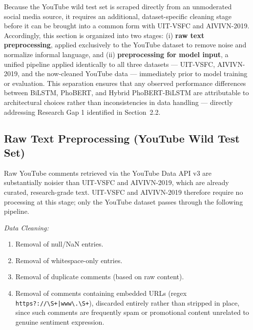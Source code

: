 \documentclass[12pt]{report} %
\begin{document}
Because the YouTube wild test set is scraped directly from an unmoderated social media source, it requires an additional, dataset-specific cleaning stage before it can be brought into a common form with UIT-VSFC and AIVIVN-2019. Accordingly, this section is organized into two stages: (i) \textbf{raw text preprocessing}, applied exclusively to the YouTube dataset to remove noise and normalize informal language, and (ii) \textbf{preprocessing for model input}, a unified pipeline applied identically to all three datasets --- UIT-VSFC, AIVIVN-2019, and the now-cleaned YouTube data --- immediately prior to model training or evaluation. This separation ensures that any observed performance differences between BiLSTM, PhoBERT, and Hybrid PhoBERT-BiLSTM are attributable to architectural choices rather than inconsistencies in data handling --- directly addressing Research Gap 1 identified in Section~2.2.

\subsection{Raw Text Preprocessing (YouTube Wild Test Set)}

Raw YouTube comments retrieved via the YouTube Data API v3 are substantially noisier than UIT-VSFC and AIVIVN-2019, which are already curated, research-grade text. UIT-VSFC and AIVIVN-2019 therefore require no processing at this stage; only the YouTube dataset passes through the following pipeline.

\textit{Data Cleaning:}
\begin{enumerate}
    \item Removal of null/NaN entries.
    \item Removal of whitespace-only entries.
    \item Removal of duplicate comments (based on raw content).
    \item Removal of comments containing embedded URLs (regex \texttt{https?://\textbackslash S+|www\textbackslash .\textbackslash S+}), discarded entirely rather than stripped in place, since such comments are frequently spam or promotional content unrelated to genuine sentiment expression.
\end{enumerate}
\end{document}
